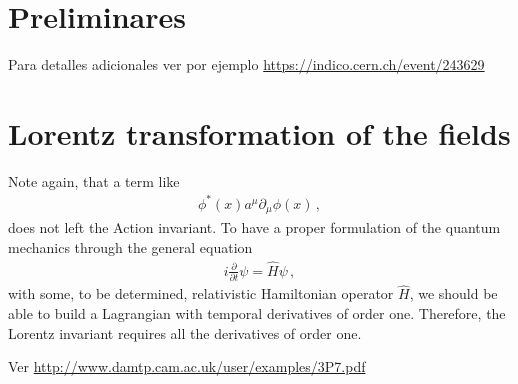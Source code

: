 \section{Preliminares}

Para detalles adicionales ver por ejemplo \url{https://indico.cern.ch/event/243629}


\section{Lorentz transformation of the fields}

Note again, that a term like
\begin{align}
\label{eq:nolor}
  \phi^*(x)a^\mu\partial_\mu\phi(x)\,,
\end{align}
does not left the Action invariant. To have a proper formulation of the quantum mechanics through the general equation
\begin{align}
  i\frac{\partial}{\partial t}\psi=\hat{H} \psi\,,  
\end{align}
with some, to be determined, relativistic Hamiltonian operator $\widehat{H}$, we should be able to build a Lagrangian with temporal derivatives of order one. Therefore, the Lorentz invariant requires all the derivatives of order one.

Ver \url{http://www.damtp.cam.ac.uk/user/examples/3P7.pdf}

